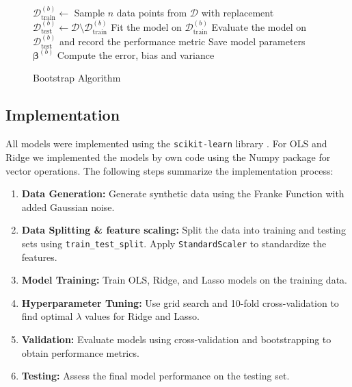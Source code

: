 \begin{figure}[H]
    \begin{algorithm}[H]
    \caption{Bootstrap Algorithm \cite{openai2023chatgpt}}
    \label{algo:bootstrap}
        \begin{algorithmic}[1]
                \State $\mathcal{D}^{(b)}_{\text{train}} \gets$ Sample $n$ data points from $\mathcal{D}$ with replacement
                \State $\mathcal{D}^{(b)}_{\text{test}} \gets \mathcal{D} \setminus \mathcal{D}^{(b)}_{\text{train}}$ 
                \State Fit the model on $\mathcal{D}^{(b)}_{\text{train}}$
                \State Evaluate the model on $\mathcal{D}^{(b)}_{\text{test}}$ and record the performance metric
                \State Save model parameters $\boldsymbol{\beta}^{(b)}$
            \EndFor
            \State Compute the error, bias and variance
            \EndProcedure
        \end{algorithmic}
    \end{algorithm}
\end{figure}


\subsection{Implementation}

All models were implemented using the \texttt{scikit-learn} library \cite{scikit-learn}. For OLS and Ridge we implemented the models by own code using the Numpy package \cite{harris2020numpy} for vector operations. The following steps summarize the implementation process:

\begin{enumerate}
    \item \textbf{Data Generation:} Generate synthetic data using the Franke Function with added Gaussian noise.
    \item \textbf{Data Splitting \& feature scaling:} Split the data into training and testing sets using \texttt{train\_test\_split}. Apply \texttt{StandardScaler} to standardize the features.
    \item \textbf{Model Training:} Train OLS, Ridge, and Lasso models on the training data.
    \item \textbf{Hyperparameter Tuning:} Use grid search and 10-fold cross-validation to find optimal $\lambda$ values for Ridge and Lasso.
    \item \textbf{Validation:} Evaluate models using cross-validation and bootstrapping to obtain performance metrics.
    \item \textbf{Testing:} Assess the final model performance on the testing set.
\end{enumerate}

